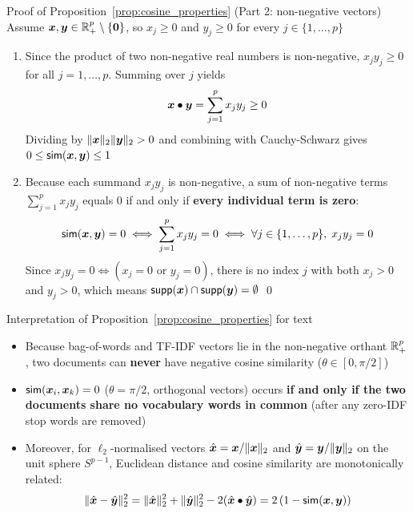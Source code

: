\documentclass[aspectratio=169]{beamer}\usepackage[]{graphicx}\usepackage[]{xcolor}
\begin{document}
\begin{frame}[red]{Proof of Proposition~\ref{prop:cosine_properties} (Part 2: non-negative vectors)}
Assume $\bx, \by \in \IRplus^p \setminus \{\b0\}$, so $x_j \ge 0$ and $y_j \ge 0$ for every $j \in \{1, \ldots, p\}$
\vfill
\begin{enumerate}
\item Since the product of two non-negative real numbers is non-negative, $x_j y_j \ge 0$ for all $j = 1, \ldots, p$. Summing over $j$ yields
\[
\bm{x} \bullet \bm{y} = \sum_{j=1}^p x_j y_j \ge 0
\]
Dividing by $\|\bm{x}\|_2 \|\bm{y}\|_2 > 0$ and combining with Cauchy-Schwarz gives $0 \le \mathsf{sim}(\bm{x}, \bm{y}) \le 1$
\vfill
\item Because each summand $x_j y_j$ is non-negative, a sum of non-negative terms $\sum_{j=1}^p x_j y_j$ equals $0$ if and only if \textbf{every individual term is zero}:
\[
\mathsf{sim}(\bm{x}, \bm{y}) = 0 \iff \sum_{j=1}^p x_j y_j = 0 \iff \forall j \in \{1,\ldots,p\},\; x_j y_j = 0
\]
Since $x_j y_j = 0 \iff (x_j = 0 \textrm{ or } y_j = 0)$, there is no index $j$ with both $x_j > 0$ and $y_j > 0$, which means $\mathsf{supp}(\bm{x}) \cap \mathsf{supp}(\bm{y}) = \emptyset$ \hfill\qed
\end{enumerate}
\end{frame}


\begin{frame}{Interpretation of Proposition~\ref{prop:cosine_properties} for text}
\begin{itemize}
\item Because bag-of-words and TF-IDF vectors lie in the non-negative orthant $\mathbb{R}_+^p$, two documents can \textbf{never} have negative cosine similarity ($\theta \in [0, \pi/2]$)
\vfill
\item $\mathsf{sim}(\bm{x}_i, \bm{x}_k) = 0$ ($\theta = \pi/2$, orthogonal vectors) occurs \textbf{if and only if the two documents share no vocabulary words in common} (after any zero-IDF stop words are removed)
\vfill
\item Moreover, for $\ell_2$-normalised vectors $\hat{\bm{x}} = \bm{x}/\|\bm{x}\|_2$ and $\hat{\bm{y}} = \bm{y}/\|\bm{y}\|_2$ on the unit sphere $S^{p-1}$, Euclidean distance and cosine similarity are monotonically related:
\[
\|\hat{\bm{x}} - \hat{\bm{y}}\|_2^2 = \|\hat{\bm{x}}\|_2^2 + \|\hat{\bm{y}}\|_2^2 - 2(\hat{\bm{x}} \bullet \hat{\bm{y}}) = 2\left(1 - \mathsf{sim}(\bm{x}, \bm{y})\right)
\]
\end{itemize}
\end{frame}
\end{document}
